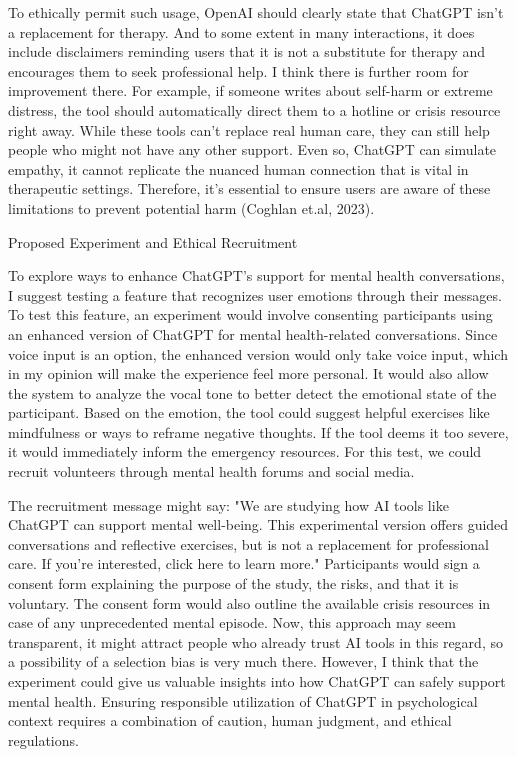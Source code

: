 \documentclass[
	letterpaper, %
]{jdf}
\begin{document}
To ethically permit such usage, OpenAI should clearly state that ChatGPT isn’t a replacement for therapy. And to some extent in many interactions, it does include disclaimers reminding users that it is not a substitute for therapy and encourages them to seek professional help. I think there is further room for improvement there. For example, if someone writes about self-harm or extreme distress, the tool should automatically direct them to a hotline or crisis resource right away. While these tools can’t replace real human care, they can still help people who might not have any other support. Even so, ChatGPT can simulate empathy, it cannot replicate the nuanced human connection that is vital in therapeutic settings. Therefore, it's essential to ensure users are aware of these limitations to prevent potential harm (Coghlan et.al, 2023). 

Proposed Experiment and Ethical Recruitment

To explore ways to enhance ChatGPT's support for mental health conversations, I suggest testing a feature that recognizes user emotions through their messages. To test this feature, an experiment would involve consenting participants using an enhanced version of ChatGPT for mental health-related conversations. Since voice input is an option, the enhanced version would only take voice input, which in my opinion will make the experience feel more personal. It would also allow the system to analyze the vocal tone to better detect the emotional state of the participant. Based on the emotion, the tool could suggest helpful exercises like mindfulness or ways to reframe negative thoughts. If the tool deems it too severe, it would immediately inform the emergency resources. For this test, we could recruit volunteers through mental health forums and social media.

The recruitment message might say: "We are studying how AI tools like ChatGPT can support mental well-being. This experimental version offers guided conversations and reflective exercises, but is not a replacement for professional care. If you’re interested, click here to learn more." Participants would sign a consent form explaining the purpose of the study, the risks, and that it is voluntary. The consent form would also outline the available crisis resources in case of any unprecedented mental episode. Now, this approach may seem transparent, it might attract people who already trust AI tools in this regard, so a possibility of a selection bias is very much there. However, I think that the experiment could give us valuable insights into how ChatGPT can safely support mental health. Ensuring responsible utilization of ChatGPT in psychological context requires a combination of caution, human judgment, and ethical regulations.
\end{document}
